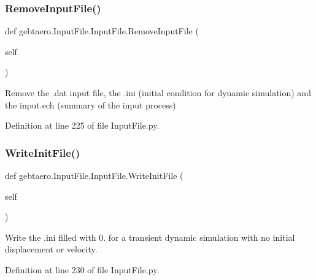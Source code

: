 \subsubsection{\texorpdfstring{Remove\+Input\+File()}{RemoveInputFile()}}
{\footnotesize\ttfamily def gebtaero.\+Input\+File.\+Input\+File.\+Remove\+Input\+File (\begin{DoxyParamCaption}\item[{}]{self }\end{DoxyParamCaption})}



Remove the .dat input file, the .ini (initial condition for dynamic simulation) and the input.\+ech (summary of the input process) 



Definition at line 225 of file Input\+File.\+py.

\mbox{\label{classgebtaero_1_1_input_file_1_1_input_file_a0138cdf368f06be59a355955c737a3c3}} 
\subsubsection{\texorpdfstring{Write\+Init\+File()}{WriteInitFile()}}
{\footnotesize\ttfamily def gebtaero.\+Input\+File.\+Input\+File.\+Write\+Init\+File (\begin{DoxyParamCaption}\item[{}]{self }\end{DoxyParamCaption})}



Write the .ini filled with 0. for a transient dynamic simulation with no initial displacement or velocity. 



Definition at line 230 of file Input\+File.\+py.

\mbox{\label{classgebtaero_1_1_input_file_1_1_input_file_aff90830e65ba0e25b330c595a94a7a82}} 
